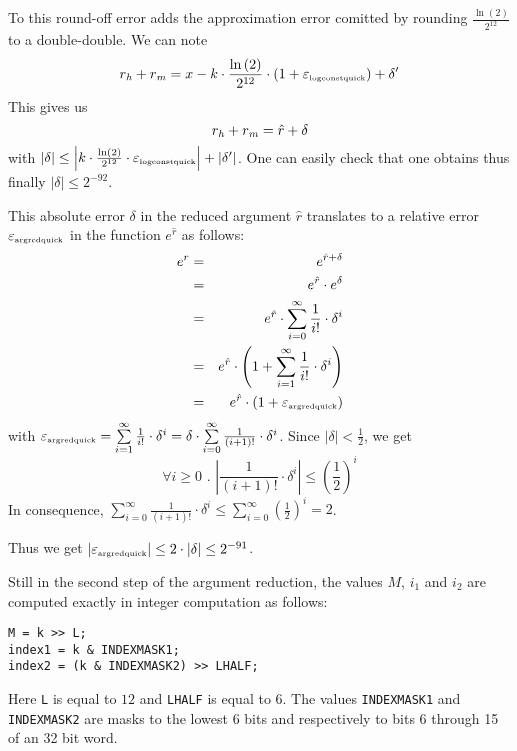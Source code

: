 To this round-off error adds the
approximation error comitted by rounding $\frac{\ln\left( 2
\right)}{2^{12}}$ to a double-double.
We can note 
$$r_\hi + r_\mi = x - k \cdot \frac{\ln\left( 2 \right)}{2^{12}} \cdot
\left( 1 + \epsilon_{\mbox{\tiny logconstquick}} \right) +
\delta^\prime$$
This gives us 
$$r_\hi + r_\mi = \hat{r} + \delta$$ with $\left \vert \delta \right
\vert \leq \left \vert k \cdot \frac{\ln\left( 2 \right)}{2^{12}}
\cdot \epsilon_{\mbox{\tiny logconstquick}} \right \vert + \left \vert
\delta^\prime \right \vert$. One can easily check that one obtains
thus finally $\left \vert \delta \right \vert \leq 2^{-92}$.

This absolute error $\delta$ in the reduced argument $\hat{r}$
translates to a relative error $\epsilon_{\mbox{\tiny argredquick}}$ in the function $e^{\hat{r}}$ as
follows:
\begin{eqnarray*}
e^r & = & e^{\hat{r} + \delta} \\
& = & e^{\hat{r}} \cdot e^{\delta} \\
& = & e^{\hat{r}} \cdot \sum\limits_{i=0}^{\infty} \frac{1}{i!} \cdot \delta^i \\
& = & e^{\hat{r}} \cdot \left( 1 + \sum\limits_{i=1}^{\infty} \frac{1}{i!} \cdot \delta^i \right) \\
& = & e^{\hat{r}} \cdot \left( 1 + \epsilon_{\mbox{\tiny argredquick}} \right)
\end{eqnarray*}
with $\epsilon_{\mbox{\tiny argredquick}} = \sum\limits_{i=1}^{\infty} \frac{1}{i!} \cdot \delta^i =
\delta \cdot \sum\limits_{i=0}^{\infty} \frac{1}{\left(i + 1 \right)!}
\cdot \delta^i$.
Since $\left \vert \delta \right \vert < \frac{1}{2}$, we get 
$$\forall i \geq 0 \mbox{ . } \left \vert \frac{1}{\left( i + 1
\right)!} \cdot \delta^i \right \vert \leq \left( \frac{1}{2}
\right)^i$$ In consequence, $\sum\limits_{i=0}^{\infty}
\frac{1}{\left(i + 1 \right)!}  \cdot \delta^i \leq
\sum\limits_{i=0}^{\infty} \left( \frac{1}{2} \right)^i = 2$.  

Thus we get $\left \vert \epsilon_{\mbox{\tiny argredquick}} \right
\vert \leq 2 \cdot \left \vert \delta \right \vert \leq 2^{-91}$.

Still in the second step of the argument reduction, the values $M$,
$i_1$ and $i_2$ are computed exactly in integer computation as
follows:
\begin{lstlisting}[caption={Argument reduction - second step (cont'd)},firstnumber=1]
M = k >> L;
index1 = k & INDEXMASK1;
index2 = (k & INDEXMASK2) >> LHALF;
\end{lstlisting}
Here \texttt{L} is equal to $12$ and \texttt{LHALF} is equal to
$6$. The values \texttt{INDEXMASK1} and \texttt{INDEXMASK2} are masks
to the lowest 6 bits and respectively to bits 6 through 15 of an 32
bit word.

